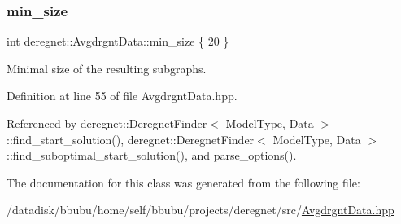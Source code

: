 \subsubsection{\texorpdfstring{min\+\_\+size}{min\_size}}
{\footnotesize\ttfamily int deregnet\+::\+Avgdrgnt\+Data\+::min\+\_\+size \{ 20 \}}



Minimal size of the resulting subgraphs. 



Definition at line 55 of file Avgdrgnt\+Data.\+hpp.



Referenced by deregnet\+::\+Deregnet\+Finder$<$ Model\+Type, Data $>$\+::find\+\_\+start\+\_\+solution(), deregnet\+::\+Deregnet\+Finder$<$ Model\+Type, Data $>$\+::find\+\_\+suboptimal\+\_\+start\+\_\+solution(), and parse\+\_\+options().



The documentation for this class was generated from the following file\+:\begin{DoxyCompactItemize}
\item 
/datadisk/bbubu/home/self/bbubu/projects/deregnet/src/\hyperlink{AvgdrgntData_8hpp}{Avgdrgnt\+Data.\+hpp}\end{DoxyCompactItemize}
